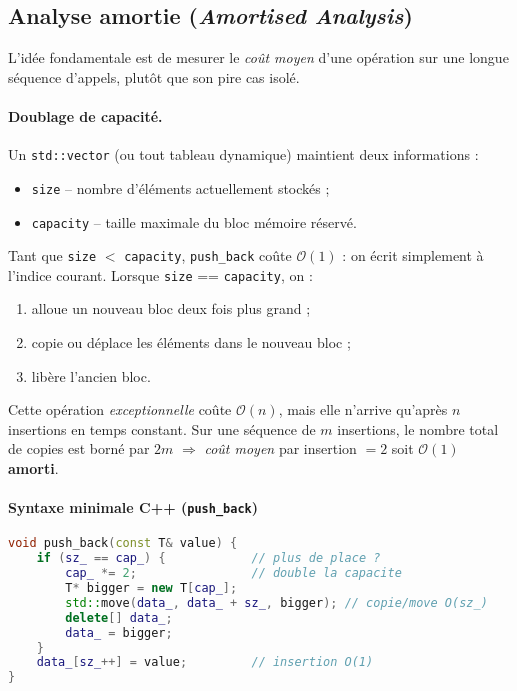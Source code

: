 \subsection{Analyse amortie (\textit{Amortised Analysis})}

L’idée fondamentale est de mesurer le \emph{coût moyen} d’une opération
sur une longue séquence d’appels, plutôt que son pire cas isolé.

\paragraph{Doublage de capacité.}
Un \lstinline|std::vector| (ou tout tableau dynamique) maintient deux
informations :
\begin{itemize}
  \item \texttt{size}  – nombre d’éléments actuellement stockés ;
  \item \texttt{capacity} – taille maximale du bloc mémoire réservé.
\end{itemize}
Tant que \texttt{size} $<$ \texttt{capacity}, \lstinline|push_back|
coûte $\mathcal{O}(1)$ : on écrit simplement à l’indice courant.
Lorsque \texttt{size} == \texttt{capacity}, on :

\begin{enumerate}
  \item alloue un nouveau bloc deux fois plus grand ;
  \item copie ou déplace les éléments dans le nouveau bloc ;
  \item libère l’ancien bloc.
\end{enumerate}

Cette opération \emph{exceptionnelle} coûte $\mathcal{O}(n)$, mais
elle n’arrive qu’après $n$ insertions en temps constant.
Sur une séquence de $m$ insertions, le nombre total de copies est
borné par $2m$ $\Rightarrow$ \emph{coût moyen} par insertion $=2$ soit
$\mathcal{O}(1)$ \textbf{amorti}.

\paragraph{Syntaxe minimale C++ (\texttt{push\_back})}

\begin{lstlisting}[language=C++,caption={push\_back avec agrandissement}]
void push_back(const T& value) {
    if (sz_ == cap_) {            // plus de place ?
        cap_ *= 2;                // double la capacite
        T* bigger = new T[cap_];
        std::move(data_, data_ + sz_, bigger); // copie/move O(sz_)
        delete[] data_;
        data_ = bigger;
    }
    data_[sz_++] = value;         // insertion O(1)
}
\end{lstlisting}


